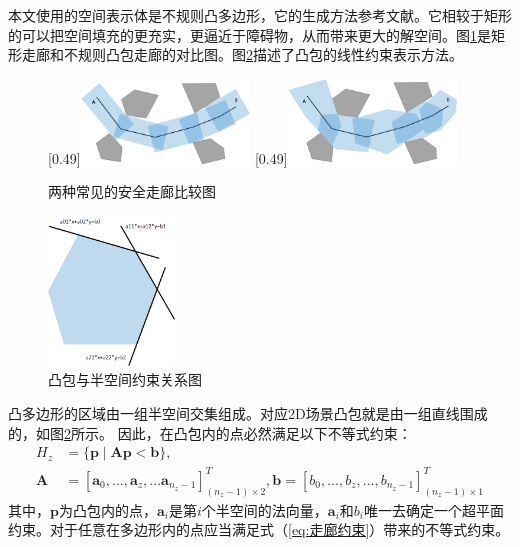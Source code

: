 \documentclass[master,academic]{ysuthesis} %
\begin{document}
	本文使用的空间表示体是不规则凸多边形，它的生成方法参考文献\cite{SikangLiu:2017}。它相较于矩形的可以把空间填充的更充实，更逼近于障碍物，从而带来更大的解空间。图\ref{安全走廊比较}是矩形走廊和不规则凸包走廊的对比图。图\ref{fig:凸包矩阵}描述了凸包的线性约束表示方法。
	\begin{figure}[H]
		\centering
		[0.49\textwidth]{\includegraphics[width=0.4\textwidth]{安全走廊比较矩形1.png}}
		[0.49\textwidth]{\includegraphics[width=0.4\textwidth]{安全走廊比较多边形2.png}}
		\caption{两种常见的安全走廊比较图}
		\label{安全走廊比较}
	\end{figure}
	\begin{figure}[H]
		\centering
		\includegraphics[width=0.3\textwidth]{凸包矩阵.png}
		\caption{凸包与半空间约束关系图}
		\label{fig:凸包矩阵}
	\end{figure}
	
	凸多边形的区域由一组半空间交集组成。对应2D场景凸包就是由一组直线围成的，如图\ref{fig:凸包矩阵}所示。
	因此，在凸包内的点必然满足以下不等式约束：
	\begin{equation}
		\begin{aligned}
			H_z&=\{\bm{p}\mid \bm{A}\bm{p}<\bm{b}\},\\
			\bm{A}&=\left[ \bm{a}_0,...,\bm{a}_z,...\bm{a}_{n_z-1} \right]^T_{(n_z-1)\times 2},\bm{b}=\left[ b_0,...,b_z,...,b_{n_z-1} \right]^T_{(n_z-1)\times 1}
		\end{aligned}
		\label{eq:走廊约束}
	\end{equation}
	其中，$\bm{p}$为凸包内的点，$\bm{a}_i$是第$i$个半空间的法向量，$\bm{a}_i$和$b_i$唯一去确定一个超平面约束。对于任意在多边形内的点应当满足式（\ref{eq:走廊约束}）带来的不等式约束。
	
\end{document}
